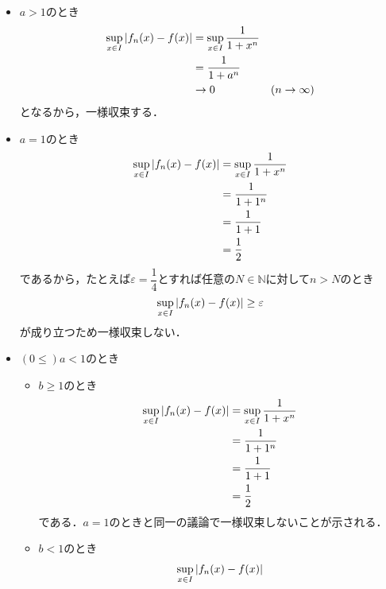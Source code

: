 \begin{enumerate}[(1)]
\begin{enumerate}[(i)]
\begin{figure}[H]
\begin{tikzpicture}[domain=0:4]
            \end{tikzpicture}
        \end{figure}
        \begin{itemize}
            \item $a>1$のとき\\
            \begin{align}
                \sup_{x\in I}\abs{f_n(x)-f(x)}
                &=\sup_{x\in I}\frac{1}{1+x^n}\\
                &=\frac{1}{1+a^n}\\
                &\to 0& (n\to\infty)
            \end{align}
            となるから，一様収束する．
            \item $a=1$のとき\\
            \begin{align}
                \sup_{x\in I}\abs{f_n(x)-f(x)}
                &=\sup_{x\in I}\frac{1}{1+x^n}\\
                &=\frac{1}{1+1^n}\\
                &=\frac{1}{1+1}\\
                &=\frac{1}{2}
            \end{align}
            であるから，たとえば$\varepsilon = \dfrac{1}{4}$とすれば任意の$N\in\mathbb{N}$に対して$n>N$のとき
            \begin{equation}
                \sup_{x\in I}\abs{f_n(x)-f(x)}\ge \varepsilon
            \end{equation}
            が成り立つため一様収束しない．
            \item $(0\le)a<1$のとき
            \begin{itemize}
                \item $b\ge 1$のとき
                \begin{align}
                    \sup_{x\in I}\abs{f_n(x)-f(x)}
                    &=\sup_{x\in I}\dfrac{1}{1+x^n}\\
                    &=\dfrac{1}{1+1^n}\\
                    &=\dfrac{1}{1+1}\\
                    &=\dfrac{1}{2}
                \end{align}
                である．$a=1$のときと同一の議論で一様収束しないことが示される．
                \item $b<1$のとき
                \begin{align}
                    \sup_{x\in I}\abs{f_n(x)-f(x)}

\end{align}
\end{itemize}
\end{itemize}
\end{enumerate}
\end{enumerate}
